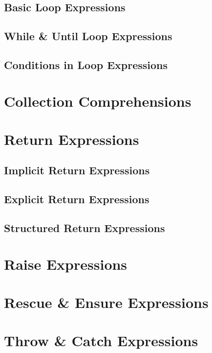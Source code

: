 \subsection{Basic Loop Expressions}

\subsection{While \& Until Loop Expressions}

\subsection{Conditions in Loop Expressions}

\section{Collection Comprehensions}

\section{Return Expressions}

\subsection{Implicit Return Expressions}

\subsection{Explicit Return Expressions}

\subsection{Structured Return Expressions}

\section{Raise Expressions}

\section{Rescue \& Ensure Expressions}


\section{Throw \& Catch Expressions}

